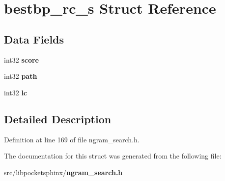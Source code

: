 \section{bestbp\+\_\+rc\+\_\+s Struct Reference}
\label{structbestbp__rc__s}
\subsection*{Data Fields}
\begin{DoxyCompactItemize}
\item 
int32 {\bfseries score}\label{structbestbp__rc__s_a22fb17e130599acbde1fac4debcca469}

\item 
int32 {\bfseries path}\label{structbestbp__rc__s_a3cc3a67aa32da9669c5305f7ebb2e7ce}

\item 
int32 {\bfseries lc}\label{structbestbp__rc__s_a33fd8891076deb0d592e038cddca66a4}

\end{DoxyCompactItemize}


\subsection{Detailed Description}


Definition at line 169 of file ngram\+\_\+search.\+h.



The documentation for this struct was generated from the following file\+:\begin{DoxyCompactItemize}
\item 
src/libpocketsphinx/{\bf ngram\+\_\+search.\+h}\end{DoxyCompactItemize}
